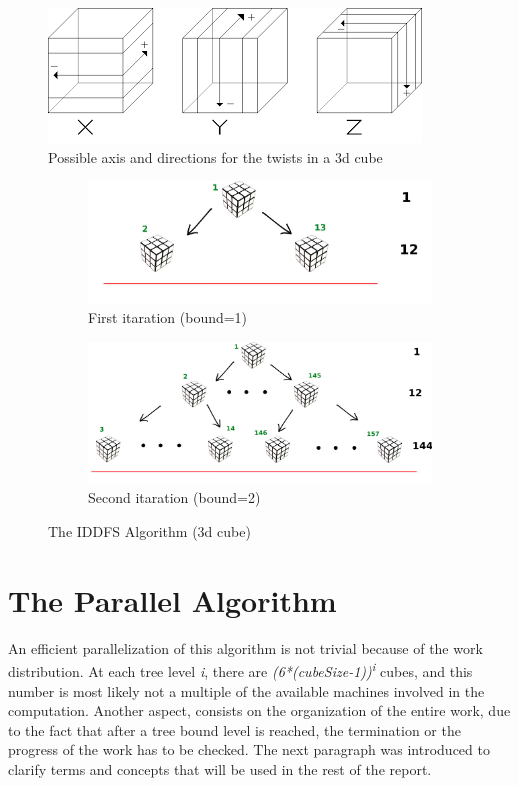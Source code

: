 \documentclass[a4paper]{article}
\begin{document}
\begin{figure}[ht]
  \centering
  \includegraphics[width=0.5\linewidth]{xyz}
  \caption{Possible axis and directions for the twists in a 3d cube}
  \label{fig:tw}
\end{figure}
\FloatBarrier

\begin{figure}
\begin{subfigure}{0.40\textwidth}
\includegraphics[width=\linewidth]{rubik_tree_eval1}
\caption{First itaration (bound=1)} \label{fig:ita}
\end{subfigure}
\hspace*{\fill} %
\begin{subfigure}{0.60\textwidth}
\includegraphics[width=\linewidth]{rubik_tree_eval2}
\caption{Second itaration (bound=2)} \label{fig:itb}
\end{subfigure}
\caption{The IDDFS Algorithm (3d cube)} \label{fig:iterations}
\end{figure}
\FloatBarrier

\section{The Parallel Algorithm}
\label{sec:par_algo}
An efficient parallelization of this algorithm is not trivial because of the work distribution. At each tree level \textit{i}, there are \textit{(6*(cubeSize-1))\textsuperscript{i}} cubes, and this number is most likely not a multiple of the available machines involved in the computation. Another aspect, consists on the organization of the entire work, due to the fact that after a tree bound level is reached, the termination or the progress of the work has to be checked. The next paragraph was introduced to clarify terms and concepts that will be used in the rest of the report.
\end{document}
